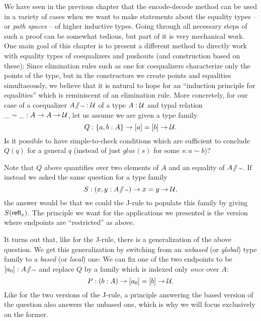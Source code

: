 We have seen in the previous chapter that the encode-decode method can be used
in a variety of cases when we want to make statements about the equality
types -- or \emph{path spaces} -- of higher inductive types.
Going through all necessary steps of such a proof can be somewhat tedious, but
part of it is very mechanical work.
One main goal of this chapter is to present a different method to
directly work with equality types of coequalizers and pushouts
(and construction based on these):
Since elimination rules such as one for coequalizers characterize only
the points  of the type, but in the constructors we create points
and equalities simultaeously, we believe that it is natural to hope for
an ``induction principle for equalities'' which is reminiscent of an elimination
rule.
More concretely, for our case of a coequalizer $A \! \sslash \! {\scriptstyle \sim} : \mathcal{U}$ of a type $A : \mathcal{U}$
and typal relation $\_\sim\_ : A \to A \to \mathcal{U}$,
let us assume we are given a type family
\begin{equation*}
Q: \{a, b : A\} \to [a] = [b] \to \mathcal{U} \text{.}
\end{equation*}
Is it possible to have simple-to-check conditions which are sufficient to
conclude $Q(q)$ for a general $q$ (instead of just $glue(s)$ for some $s : a \sim b$)?

\begin{remark}
Note that $Q$ above quantifies over two elements of $A$ and an equality of $A \! \sslash \! {\scriptstyle \sim}$.
If instead we asked the same question for a type family
\begin{equation*}
S: (x, y : A \! \sslash \! {\scriptstyle \sim}) \to x = y \to \mathcal{U} \text{,}
\end{equation*}
the answer would be that we could the J-rule to populate this family by giving
$S(\mathsf{refl}_x)$.
The principle we want for the applications we presented is the version
where endpoints are ``restricted'' as above.
\end{remark}

It turns out that, like for the J-rule, there is a generalization of the above question.
We get this generalization by switching from an \emph{unbased} (or \emph{global}) type family
to a \emph{based} (or \emph{local}) one:
We can fix one of the two endpoints to be $[a_0] : A \! \sslash \! {\scriptstyle \sim}$ and replace $Q$
by a family which is indexed only \emph{once} over $A$:
\begin{equation}
P : (b : A) \to [a_0] = [b] \to \mathcal{U} \text{.}
\end{equation}
Like for the two versions of the J-rule, a principle answering the based version
of the question also answers the unbased one, which is why we will focus
exclusively on the former.

